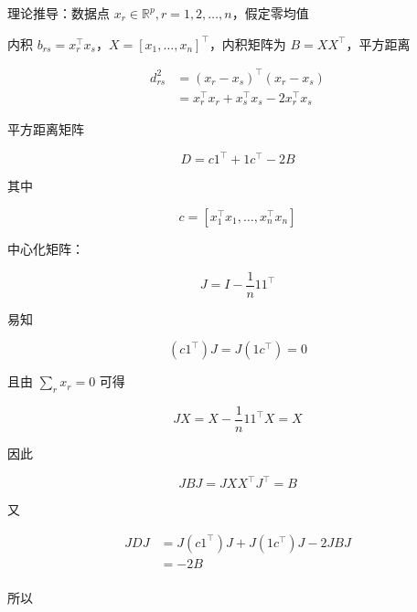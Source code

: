 \documentclass[openany,a4paper,12pt]{ctexbook}
\theoremstyle{kaiti}
\theoremstyle{normal}
\begin{document}
理论推导：数据点 $x_r\in \mathbb{R} ^p, r=1,2,\dots ,n$，假定零均值

内积 $b_{rs}=x_{r}^{\top}x_s$，$X=\left[x_1,\dots ,x_n \right] ^{\top}$，内积矩阵为 $B=XX^{\top}$，平方距离

\begin{equation}
\begin{aligned}
  d_{rs}^{2}
  &=\left(x_r-x_s \right)^{\top}\left(x_r-x_s \right)\\
  &=x_{r}^{\top}x_r+x_{s}^{\top}x_s-2x_{r}^{\top}x_s
\end{aligned}
\end{equation}

平方距离矩阵

\begin{equation}
D=c1^{\top}+1c^{\top}-2B
\end{equation}

其中

\begin{equation}
c=\left[x_{1}^{\top}x_1,\dots ,x_{n}^{\top}x_n \right]
\end{equation}

中心化矩阵：

\begin{equation}
J=I-\frac{1}{n}11^{\top}
\end{equation}

易知

\begin{equation}
\left(c1^{\top} \right)J=J\left(1c^{\top} \right)=0
\end{equation}

且由 $\sum_rx_r=0$ 可得

\begin{equation}
JX=X-\frac{1}{n}11^{\top}X=X
\end{equation}

因此

\begin{equation}
JBJ=JXX^{\top}J^{\top}=B
\end{equation}

又

\begin{equation}
\begin{aligned}
  JDJ&=J\left(c1^{\top} \right)J+J\left(1c^{\top} \right)J-2JBJ\\
  &=-2B \\
\end{aligned}
\end{equation}

所以
\end{document}
